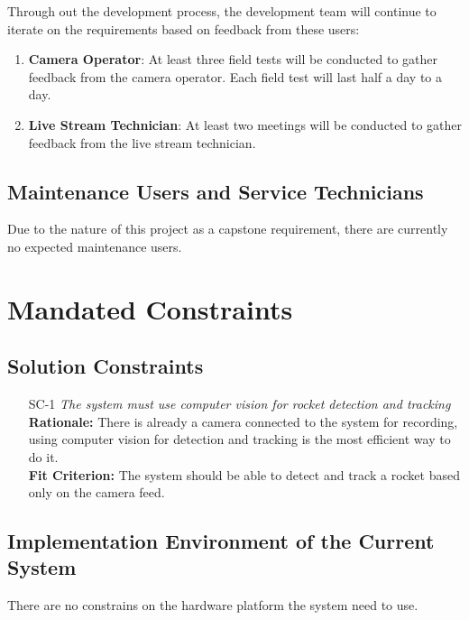 \documentclass[12pt]{article}
\begin{document}
Through out the development process, the development team will continue to
iterate on the requirements based on feedback from these users:

\begin{enumerate}
  \item \textbf{Camera Operator}: At least three field tests will be conducted
        to gather feedback from the camera operator. Each field test will last
        half a day to a day.
  \item \textbf{Live Stream Technician}: At least two meetings will be conducted
        to gather feedback from the live stream technician.
\end{enumerate}

\subsection{Maintenance Users and Service Technicians}

Due to the nature of this project as a capstone requirement, there are
currently no expected maintenance users.

\section{Mandated Constraints}
\subsection{Solution Constraints}

\begin{itemize}[leftmargin=*]
  \item[SC-1] \emph{The system must use computer vision for rocket detection and
          tracking}\\[2mm]
        \textbf{Rationale:} There is already a camera connected to the system for recording, using computer vision for detection and tracking is the most efficient way to do it. \\
        \textbf{Fit Criterion:} The system should be able to detect and track a rocket based only on the camera feed.
\end{itemize}

\subsection{Implementation Environment of the Current System}

There are no constrains on the hardware platform the system need to use.
\end{document}
